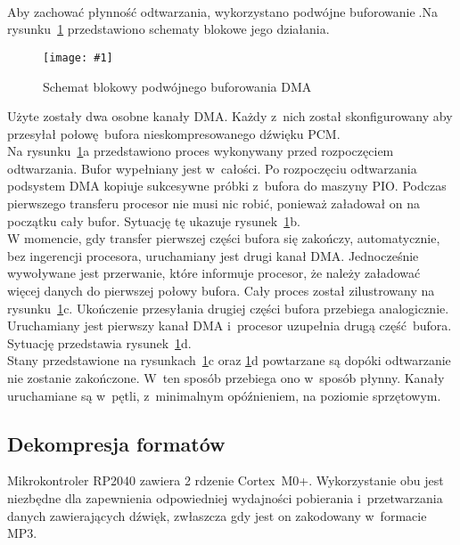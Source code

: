 \documentclass[polish]{aghengthesis}
\newcommand{\imgint}[4]{
	\begin{figure}[{#4}]
		\centering
		\texttt{[image: \#1]}
		\caption{#2}
		\label{#1}
	\end{figure}
}
\newcommand{\imgh}[3]{\imgint{#1}{#2}{#3}{H}}
\begin{document}
			\newcommand{\rdmabuf}[1]{\ref{3/PicoRadio-dma-buf}#1}
			\newcommand{\dmacite}{\textsuperscript{\cite{dma_dbl_buf1} \cite{dma_dbl_buf2}}}
			
			Aby zachować płynność odtwarzania, wykorzystano podwójne buforowanie\dmacite{}.Na rysunku~\rdmabuf{} przedstawiono schematy blokowe jego działania.
			
			\imgh{3/PicoRadio-dma-buf}{Schemat blokowy podwójnego buforowania DMA\dmacite{}}{1}
			
			Użyte zostały dwa osobne kanały DMA. Każdy z~nich został skonfigurowany aby przesyłał połowę bufora nieskompresowanego dźwięku PCM.
			$ $\\
			
			Na rysunku~\rdmabuf{a} przedstawiono proces wykonywany przed rozpoczęciem odtwarzania.
			Bufor wypełniany jest w~całości.
			Po rozpoczęciu odtwarzania podsystem DMA kopiuje sukcesywne próbki z~bufora do maszyny PIO. Podczas pierwszego transferu procesor nie musi nic robić, ponieważ załadował on na początku cały bufor. Sytuację tę ukazuje rysunek~\rdmabuf{b}.
			$ $\\
			
			W momencie, gdy transfer pierwszej części bufora się zakończy, automatycznie, bez ingerencji procesora, uruchamiany jest drugi kanał DMA. Jednocześnie wywoływane jest przerwanie, które informuje procesor, że należy załadować więcej danych do pierwszej połowy bufora. Cały proces został zilustrowany na rysunku~\rdmabuf{c}.
			Ukończenie przesyłania drugiej części bufora przebiega analogicznie. Uruchamiany jest pierwszy kanał DMA i~procesor uzupełnia drugą część bufora. Sytuację przedstawia rysunek~\rdmabuf{d}.
			$ $\\
		
			Stany przedstawione na rysunkach~\rdmabuf{c} oraz \rdmabuf{d} powtarzane są dopóki odtwarzanie nie zostanie zakończone. W~ten sposób przebiega ono w~sposób płynny. Kanały uruchamiane są w~pętli, z~minimalnym opóźnieniem, na poziomie sprzętowym. 			
		
		\subsection{Dekompresja formatów}
			\label{sec:decode}
			
			Mikrokontroler RP2040 zawiera 2 rdzenie Cortex~M0+. Wykorzystanie obu jest niezbędne dla zapewnienia odpowiedniej wydajności pobierania i~przetwarzania danych zawierających dźwięk, zwłaszcza gdy jest on zakodowany w~formacie MP3.
			$ $\\
			
\end{document}
